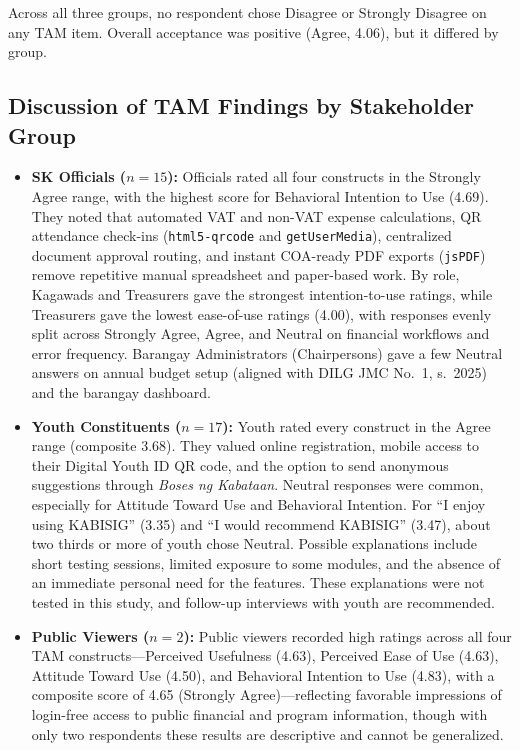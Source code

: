 \hspace*{\parindent}Across all three groups, no respondent chose Disagree or Strongly Disagree on any TAM item. Overall acceptance was positive (Agree, 4.06), but it differed by group.
\vspace{5mm}

\subsection{Discussion of TAM Findings by Stakeholder Group}
\label{subsec:discussion_of_tam_findings_by_stakeholder_group}

\begin{itemize}
    \item \textbf{SK Officials ($n = 15$):} Officials rated all four constructs in the Strongly Agree range, with the highest score for Behavioral Intention to Use (4.69). They noted that automated VAT and non-VAT expense calculations, QR attendance check-ins (\texttt{html5-qrcode} and \texttt{getUserMedia}), centralized document approval routing, and instant COA-ready PDF exports (\texttt{jsPDF}) remove repetitive manual spreadsheet and paper-based work. By role, Kagawads and Treasurers gave the strongest intention-to-use ratings, while Treasurers gave the lowest ease-of-use ratings (4.00), with responses evenly split across Strongly Agree, Agree, and Neutral on financial workflows and error frequency. Barangay Administrators (Chairpersons) gave a few Neutral answers on annual budget setup (aligned with DILG JMC No.~1, s.~2025) and the barangay dashboard.
    \item \textbf{Youth Constituents ($n = 17$):} Youth rated every construct in the Agree range (composite 3.68). They valued online registration, mobile access to their Digital Youth ID QR code, and the option to send anonymous suggestions through \textit{Boses ng Kabataan}. Neutral responses were common, especially for Attitude Toward Use and Behavioral Intention. For ``I enjoy using KABISIG'' (3.35) and ``I would recommend KABISIG'' (3.47), about two thirds or more of youth chose Neutral. Possible explanations include short testing sessions, limited exposure to some modules, and the absence of an immediate personal need for the features. These explanations were not tested in this study, and follow-up interviews with youth are recommended.
    \item \textbf{Public Viewers ($n = 2$):} Public viewers recorded high ratings across all four TAM constructs---Perceived Usefulness (4.63), Perceived Ease of Use (4.63), Attitude Toward Use (4.50), and Behavioral Intention to Use (4.83), with a composite score of 4.65 (Strongly Agree)---reflecting favorable impressions of login-free access to public financial and program information, though with only two respondents these results are descriptive and cannot be generalized.
\end{itemize}
\vspace{5mm}

